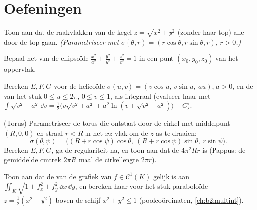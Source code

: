 \section{Oefeningen}

\begin{exercise}[$\star$]\label{exo:b2:surfaces:1}
Toon aan dat de raakvlakken van de kegel $z = \sqrt{x^2 + y^2}$
(zonder haar top) alle door de top gaan. \emph{(Parametriseer met
$\sigma(\theta, r) = (r\cos\theta, r\sin\theta, r)$, $r > 0$.)}
\end{exercise}

\begin{exercise}[$\star$]\label{exo:b2:surfaces:2}
Bepaal het  van de ellipsoïde $\frac{x^2}{a^2} +
\frac{y^2}{b^2} + \frac{z^2}{c^2} = 1$ in een punt $(x_0, y_0,
z_0)$ van het oppervlak.
\end{exercise}

\begin{exercise}[$\star$]\label{exo:b2:surfaces:3}
Bereken $E, F, G$ voor de helicoïde $\sigma(u, v) = (v\cos u,\
v\sin u,\ au)$, $a > 0$, en de  van het stuk $0 \leq u
\leq 2\pi$, $0 \leq v \leq 1$, als integraal (evalueer haar met
$\int\sqrt{v^2 + a^2}\,\dd v = \frac12\bigl(v\sqrt{v^2+a^2} +
a^2\ln(v + \sqrt{v^2 + a^2})\bigr) + C$).
\end{exercise}

\begin{exercise}[$\star\star$]\label{exo:b2:surfaces:4}
(Torus) Parametriseer de torus die ontstaat door de cirkel met
middelpunt $(R, 0, 0)$ en straal $r < R$ in het $xz$-vlak om de
$z$-as te draaien:
\[
\sigma(\theta, \psi) = \bigl((R + r\cos\psi)\cos\theta,\
(R + r\cos\psi)\sin\theta,\ r\sin\psi\bigr).
\]
Bereken $E, F, G$, ga de regulariteit na, en toon aan dat de
 $4\pi^2 R r$ is (Pappus: de gemiddelde omtrek $2\pi R$
maal de cirkellengte $2\pi r$).
\end{exercise}

\begin{exercise}[$\star\star$]\label{exo:b2:surfaces:5}
Toon aan dat de  van de grafiek van $f \in
\mathcal{C}^1(K)$ gelijk is aan $\iint_K \sqrt{1 + f_x^2 +
f_y^2}\,\dd x\,\dd y$, en bereken haar voor het stuk paraboloïde $z
= \frac12(x^2 + y^2)$ boven de schijf $x^2 + y^2 \leq 1$
(poolcoördinaten, \cref{ch:b2:multint}).
\end{exercise}

